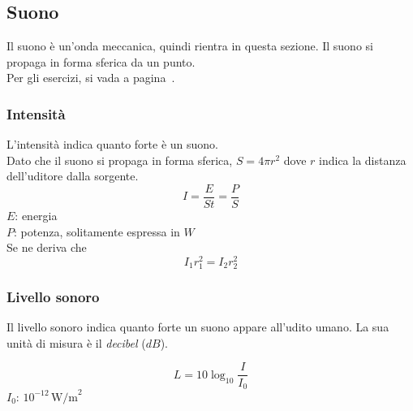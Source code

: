 \subsection{Suono}\label{subsec:onde:suono}
Il suono è un'onda meccanica, quindi rientra in questa sezione. Il suono si propaga in forma
sferica da un punto.\\[\baselineskip]
Per gli esercizi, si vada a pagina~\pageref{ex:suono}.

\subsubsection{Intensità}
L'intensità indica quanto forte è un suono. \\
Dato che il suono si propaga in forma sferica, 
$S = 4\pi r^2$ dove $r$ indica la distanza dell'uditore dalla sorgente.
\begin{equation*}
I = \frac{E}{St} = \frac{P}{S}
\end{equation*}
$E$: energia\\
$P$: potenza, solitamente espressa in $W$\\[\baselineskip]
Se ne deriva che
\begin{equation*}
I_1r_1^2 = I_2r_2^2
\end{equation*}
\begin{center}
\end{center}


\subsubsection{Livello sonoro}
Il livello sonoro indica quanto forte un suono appare all'udito umano. La sua unità di misura è il
\emph{decibel} ($dB$).

\begin{equation*}
	L = 10\log_{10}\frac{I}{I_0}
\end{equation*}
\hyperref[tab:I0]{$I_0$}: $10^{-12}\,\text{W/m}^2$

